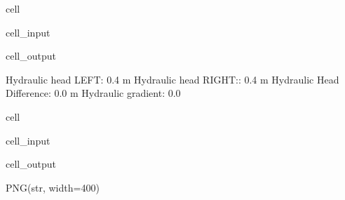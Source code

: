 \documentclass[letterpaper,10pt,english]{jupyterBook}
\begin{document}
\begin{sphinxuseclass}{cell}
\begin{sphinxVerbatimInput}
\begin{sphinxuseclass}{cell_input}
\end{sphinxuseclass}\end{sphinxVerbatimInput}
\begin{sphinxVerbatimOutput}

\begin{sphinxuseclass}{cell_output}
\begin{sphinxVerbatim}[commandchars=\\\{\}]
Hydraulic head LEFT: 0.4 m
Hydraulic head RIGHT:: 0.4 m
Hydraulic Head Difference: 0.0 m
Hydraulic gradient: 0.0
\end{sphinxVerbatim}

\end{sphinxuseclass}\end{sphinxVerbatimOutput}

\end{sphinxuseclass}
\begin{sphinxuseclass}{cell}\begin{sphinxVerbatimInput}

\begin{sphinxuseclass}{cell_input}
\begin{sphinxVerbatim}[commandchars=\\\{\}]
   
\end{sphinxVerbatim}

\end{sphinxuseclass}\end{sphinxVerbatimInput}
\begin{sphinxVerbatimOutput}

\begin{sphinxuseclass}{cell_output}
\begin{sphinxVerbatim}[commandchars=\\\{\}]
PNG(str, width=400)
\end{sphinxVerbatim}

\end{sphinxuseclass}\end{sphinxVerbatimOutput}

\end{sphinxuseclass}
\end{document}
